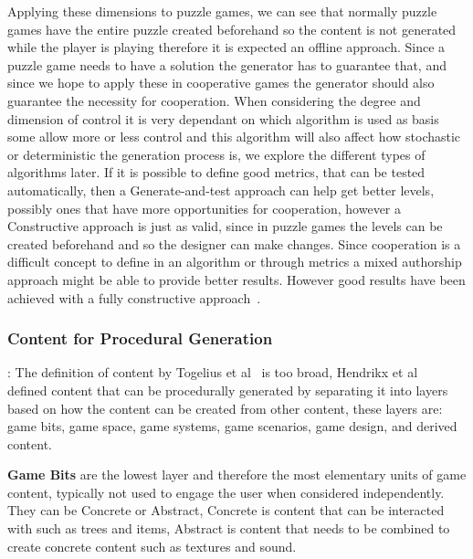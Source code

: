 \documentclass[runningheads]{llncs}
\begin{document}
Applying these dimensions to puzzle games, we can see that normally puzzle games have the entire puzzle created beforehand so the content is not generated while the player is playing therefore it is expected an offline approach. Since a puzzle game needs to have a solution the generator has to guarantee that, and since we hope to apply these in cooperative games the generator should also guarantee the necessity for cooperation. When considering the degree and dimension of control it is very dependant on which algorithm is used as basis some allow more or less control and this algorithm will also affect how stochastic or deterministic the generation process is, we explore the different types of algorithms later. If it is possible to define good metrics, that can be tested automatically, then a Generate-and-test approach can help get better levels, possibly ones that have more opportunities for cooperation, however a Constructive approach is just as valid, since in puzzle games the levels can be created beforehand and so the designer can make changes. Since cooperation is a difficult concept to define in an algorithm or through metrics a mixed authorship approach might be able to provide better results. However good results have been achieved with a fully constructive approach~\cite{ref_arkel}.

\subsubsection{Content for Procedural Generation}:
The definition of content by Togelius et al~\cite{ref_togelius} is too broad, Hendrikx et al~\cite{ref_hendrikx} defined content that can be procedurally generated by separating it into layers based on how the content can be created from other content, these layers are: game bits, game space, game systems, game scenarios, game design, and derived content.

\textbf{Game Bits} are the lowest layer and therefore the most elementary units of game content, typically not used to engage the user when considered independently. They can be Concrete or Abstract, Concrete is content that can be interacted with such as trees and items, Abstract is content that needs to be combined to create concrete content such as textures and sound.
\end{document}
